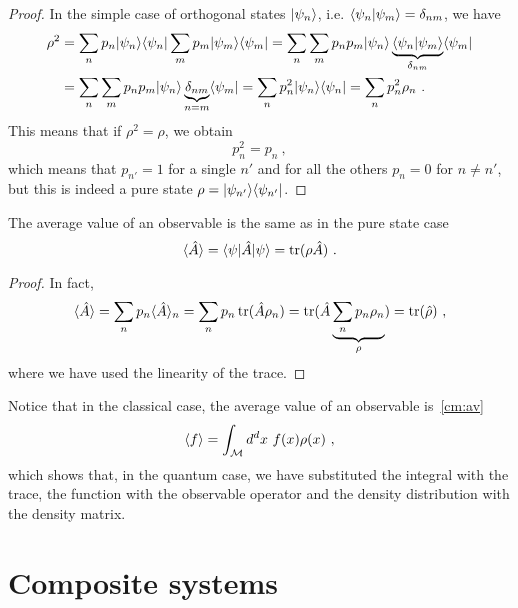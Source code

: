     \begin{proof}
        In the simple case of orthogonal states $\vert\psi_n\rangle$, i.e. $\langle\psi_n\vert\psi_m\rangle = \delta_{nm}$, we have 
        \begin{equation*}
        \begin{aligned}
            \rho^2 & = \sum_n p_n \vert\psi_n\rangle \langle\psi_n\vert \sum_m p_m \vert\psi_m\rangle \langle\psi_m\vert = \sum_n \sum_m p_n p_m \vert\psi_n\rangle \underbrace{\langle\psi_n\vert\psi_m\rangle}_{\delta_{nm}} \langle\psi_m\vert \\ & = \sum_n \sum_m p_n p_m \vert\psi_n\rangle \underbrace{\delta_{nm}}_{n=m} \langle\psi_m\vert = \sum_n p^2_n \vert\psi_n\rangle \langle\psi_n\vert = \sum_n p^2_n \rho_n ~.
        \end{aligned}
        \end{equation*}
        This means that if $\rho^2 = \rho$, we obtain 
        \begin{equation*}
            p_n^2 = p_n ~,
        \end{equation*}
        which means that $p_{n'} = 1$ for a single $n'$ and for all the others $p_n = 0$ for $n \neq n'$, but this is indeed a pure state $\rho = \vert\psi_{n'}\rangle \langle\psi_{n'}\vert$.
    \end{proof}
    The average value of an observable is the same as in the pure state case
    \begin{equation}\label{avobs}
        \langle\hat A\rangle = \langle\psi\vert \hat A \vert\psi\rangle = \operatorname{tr} (\rho \hat A) ~.
    \end{equation}
    \begin{proof}
        In fact, 
        \begin{equation*}
            \langle\hat A\rangle = \sum_n p_n \langle\hat A\rangle_n = \sum_n p_n \operatorname{tr}(\hat A \rho_n) = \operatorname{tr} (\hat A \underbrace{\sum_n p_n \rho_n}_\rho) = \operatorname{tr} (\hat \rho) ~,
        \end{equation*}
        where we have used the linearity of the trace.
    \end{proof}

    Notice that in the classical case, the average value of an observable is~\eqref{cm:av}
    \begin{equation*}
        \langle f\rangle = \int_{\mathcal M} d^d x ~ f(x) \rho(x) ~,
    \end{equation*}
    which shows that, in the quantum case, we have substituted the integral with the trace, the function with the observable operator and the density distribution with the density matrix.

\section{Composite systems}

